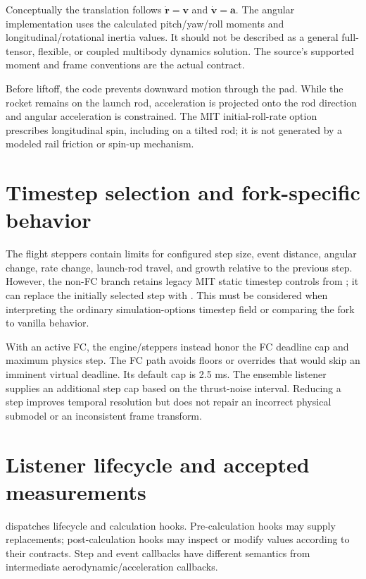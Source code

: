 Conceptually the translation follows \(\dot{\boldsymbol r}=\boldsymbol v\) and \(\dot{\boldsymbol v}=\boldsymbol a\). The angular implementation uses the calculated pitch/yaw/roll moments and longitudinal/rotational inertia values. It should not be described as a general full-tensor, flexible, or coupled multibody dynamics solution. The source's supported moment and frame conventions are the actual contract.

Before liftoff, the code prevents downward motion through the pad. While the rocket remains on the launch rod, acceleration is projected onto the rod direction and angular acceleration is constrained. The MIT initial-roll-rate option prescribes longitudinal spin, including on a tilted rod; it is not generated by a modeled rail friction or spin-up mechanism.

\section{Timestep selection and fork-specific behavior}
The flight steppers contain limits for configured step size, event distance, angular change, rate change, launch-rod travel, and growth relative to the previous step. However, the non-FC branch retains legacy MIT static timestep controls from ; it can replace the initially selected step with . This must be considered when interpreting the ordinary simulation-options timestep field or comparing the fork to vanilla behavior.

With an active FC, the engine/steppers instead honor the FC deadline cap and maximum physics step. The FC path avoids floors or overrides that would skip an imminent virtual deadline. Its default cap is 2.5 ms. The ensemble listener supplies an additional step cap based on the thrust-noise interval. Reducing a step improves temporal resolution but does not repair an incorrect physical submodel or an inconsistent frame transform.

\section{Listener lifecycle and accepted measurements}
 dispatches lifecycle and calculation hooks. Pre-calculation hooks may supply replacements; post-calculation hooks may inspect or modify values according to their contracts. Step and event callbacks have different semantics from intermediate aerodynamic/acceleration callbacks.

